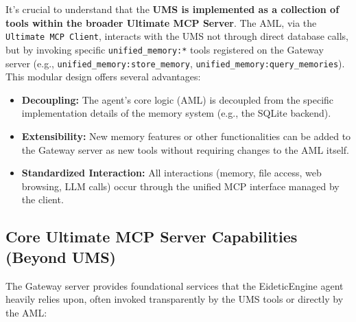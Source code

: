\documentclass[12pt,a4paper]{article}
\newcommand{\code}[1]{\nolinkurl{#1}}
\begin{document}
It's crucial to understand that the \textbf{UMS is implemented as a collection of tools within the broader Ultimate MCP Server}. The AML, via the \code{Ultimate MCP Client}, interacts with the UMS not through direct database calls, but by invoking specific \code{unified\_memory:*} tools registered on the Gateway server (e.g., \code{unified\_memory:store\_memory}, \code{unified\_memory:query\_memories}). This modular design offers several advantages:

\begin{itemize}
    \item \textbf{Decoupling:} The agent's core logic (AML) is decoupled from the specific implementation details of the memory system (e.g., the SQLite backend).
    \item \textbf{Extensibility:} New memory features or other functionalities can be added to the Gateway server as new tools without requiring changes to the AML itself.
    \item \textbf{Standardized Interaction:} All interactions (memory, file access, web browsing, LLM calls) occur through the unified MCP interface managed by the client.
\end{itemize}

\subsection{Core Ultimate MCP Server Capabilities (Beyond UMS)}

The Gateway server provides foundational services that the EideticEngine agent heavily relies upon, often invoked transparently by the UMS tools or directly by the AML:
\end{document}

